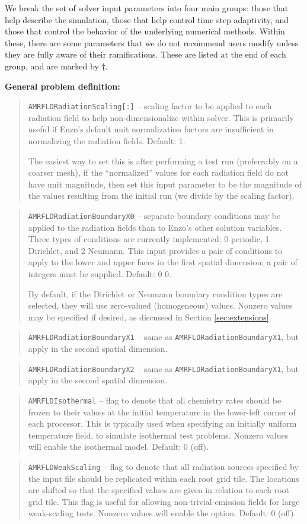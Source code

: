 \documentclass[10pt]{article}
\renewcommand{\(}{\left(}
\renewcommand{\)}{\right)}
\begin{document}
We break the set of solver input parameters into four main groups:
those that help describe the simulation, those that help control time
step adaptivity, and those that control the behavior of the underlying
numerical methods.  Within these, there are some parameters that we do
not recommend users modify unless they are fully aware of their
ramifications.  These are listed at the end of each group, and are
marked by $\dagger$.


{\bf General problem definition:}

\blockquote{{\tt AMRFLDRadiationScaling[:]} -- scaling factor to be
  applied to each radiation field to help non-dimensionalize within
  solver.  This is primarily useful if Enzo's default unit
  normalization factors are insufficient in normalizing the radiation
  fields.  Default: 1.

  The easiest way to set this is after performing a test run
  (preferrably on a coarser mesh), if the ``normalized'' values for
  each radiation field do not have unit magnitude, then set this input
  parameter to be the magnitude of the values resulting from the
  initial run (we divide by the scaling factor).}
%
\blockquote{{\tt AMRFLDRadiationBoundaryX0} -- separate boundary
  conditions may be applied to the radiation fields than to Enzo's
  other solution variables.  Three types of conditions are currently
  implemented: 0 periodic, 1 Dirichlet, and 2 Neumann.  This input
  provides a pair of conditions to apply to the lower and upper faces
  in the first spatial dimension; a pair of integers must be supplied.
  Default: 0 0.

  By default, if the Dirichlet or Neumann boundary condition types are
  selected, they will use zero-valued (homogeneous) values.  Nonzero
  values may be specified if desired, as discussed in Section
  \ref{sec:extensions}.
}
%
\blockquote{{\tt AMRFLDRadiationBoundaryX1} -- same as 
  {\tt AMRFLDRadiationBoundaryX1}, but apply in the second spatial
  dimension.} 
%
\blockquote{{\tt AMRFLDRadiationBoundaryX2} -- same as 
  {\tt AMRFLDRadiationBoundaryX1}, but apply in the second spatial
  dimension.}
%
\blockquote{{\tt AMRFLDIsothermal} -- flag to denote that all
  chemistry rates should be frozen to their values at the initial
  temperature in the lower-left corner of each processor.  This is
  typically used when specifying an initially uniform temperature
  field, to simulate isothermal test problems.  Nonzero values will
  enable the isothermal model.  Default: 0 (off).}
%
\blockquote{{\tt AMRFLDWeakScaling} -- flag to denote that all
  radiation sources specified by the input file should be replicated
  within each root grid tile.  The locations are shifted so that the
  specified values are given in relation to each root grid tile.  This
  flag is useful for allowing non-trivial emission fields for
  large weak-scaling tests.  Nonzero values will enable the option.
  Default: 0 (off).}
\end{document}
